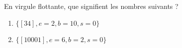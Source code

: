 
\begin{exercice}\label{exoSerieQuatre0002}

	En virgule flottante, que signifient les nombres suivants ?
	\begin{enumerate}

		\item
			$\{[34],e=2,b=10,s=0\}$
		\item
			$\{[10001],e=6,b=2,s=0\}$
	\end{enumerate}

\end{exercice}
